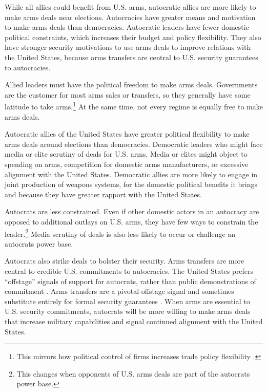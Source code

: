 \documentclass[12pt]{article}
\begin{document}
While all allies could benefit from U.S. arms, autocratic allies are more likely to make arms deals near elections. 
Autocracies have greater means and motivation to make arms deals than democracies.
Autocratic leaders have fewer domestic political constraints, which increases their budget and policy flexibility. 
They also have stronger security motivations to use arms deals to improve relations with the United States, because arms transfers are central to U.S. security guarantees to autocracies.


Allied leaders must have the political freedom to make arms deals.
Governments are the customer for most arms sales or transfers, so they generally have some latitude to take arms.\footnote{This mirrors how political control of firms increases trade policy flexibility \citep{Davisetal2019}.}
At the same time, not every regime is equally free to make arms deals. 


Autocratic allies of the United States have greater political flexibility to make arms deals around elections than democracies. 
Democratic leaders who might face media or elite scrutiny of deals for U.S. arms.
Media or elites might object to spending on arms, competition for domestic arms manufacturers, or excessive alignment with the United States.
Democratic allies are more likely to engage in joint production of weapons systems, for the domestic political benefits it brings and because they have greater rapport with the United States. 


Autocrats are less constrained.
Even if other domestic actors in an autocracy are opposed to additional outlays on U.S. arms, they have few ways to constrain the leader.\footnote{This changes when opponents of U.S. arms deals are part of the autocrats power base.}
Media scrutiny of deals is also less likely to occur or challenge an autocrats power base. 


Autocrats also strike deals to bolster their security.
Arms transfers are more central to credible U.S. commitments to autocracies.  
The United States prefers ``offstage'' signals of support for autocrats, rather than public demonstrations of commitment \citep{McManusYarhi-Milo2017}.
Arms transfers are a pivotal offstage signal and sometimes substitute entirely for formal security guarantees \citep{Yarhi-Miloetal2016}. 
When arms are essential to U.S. security commitments, autocrats will be more willing to make arms deals that increase military capabilities and signal continued alignment with the United States.
\end{document}
